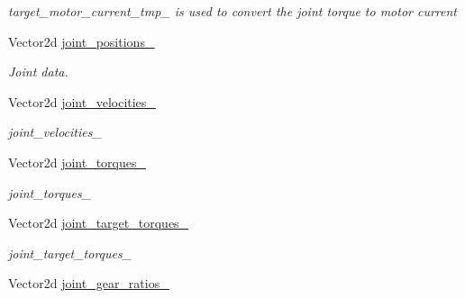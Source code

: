 \begin{DoxyCompactItemize}
\begin{DoxyCompactList}\small\item\em target\+\_\+motor\+\_\+current\+\_\+tmp\+\_\+ is used to convert the joint torque to motor current \end{DoxyCompactList}\item 
Vector2d \hyperlink{classblmc__robots_1_1SingleLeg_ad74d44ab47c78a46c2ba6a7aa9e71750}{joint\+\_\+positions\+\_\+}
\begin{DoxyCompactList}\small\item\em Joint data. \end{DoxyCompactList}\item 
Vector2d \hyperlink{classblmc__robots_1_1SingleLeg_ac383a1f260a35e47584ae7dd79be801c}{joint\+\_\+velocities\+\_\+}\hypertarget{classblmc__robots_1_1SingleLeg_ac383a1f260a35e47584ae7dd79be801c}{}\label{classblmc__robots_1_1SingleLeg_ac383a1f260a35e47584ae7dd79be801c}

\begin{DoxyCompactList}\small\item\em joint\+\_\+velocities\+\_\+ \end{DoxyCompactList}\item 
Vector2d \hyperlink{classblmc__robots_1_1SingleLeg_a1662005c929cff8e429ead0d5bbdee87}{joint\+\_\+torques\+\_\+}\hypertarget{classblmc__robots_1_1SingleLeg_a1662005c929cff8e429ead0d5bbdee87}{}\label{classblmc__robots_1_1SingleLeg_a1662005c929cff8e429ead0d5bbdee87}

\begin{DoxyCompactList}\small\item\em joint\+\_\+torques\+\_\+ \end{DoxyCompactList}\item 
Vector2d \hyperlink{classblmc__robots_1_1SingleLeg_a9c62fe22181054c020d0e10d1a68926c}{joint\+\_\+target\+\_\+torques\+\_\+}\hypertarget{classblmc__robots_1_1SingleLeg_a9c62fe22181054c020d0e10d1a68926c}{}\label{classblmc__robots_1_1SingleLeg_a9c62fe22181054c020d0e10d1a68926c}

\begin{DoxyCompactList}\small\item\em joint\+\_\+target\+\_\+torques\+\_\+ \end{DoxyCompactList}\item 
Vector2d \hyperlink{classblmc__robots_1_1SingleLeg_a99bc5106cd51eb315fc4b7a6d19da9ed}{joint\+\_\+gear\+\_\+ratios\+\_\+}\hypertarget{classblmc__robots_1_1SingleLeg_a99bc5106cd51eb315fc4b7a6d19da9ed}{}\label{classblmc__robots_1_1SingleLeg_a99bc5106cd51eb315fc4b7a6d19da9ed}


\end{DoxyCompactItemize}
